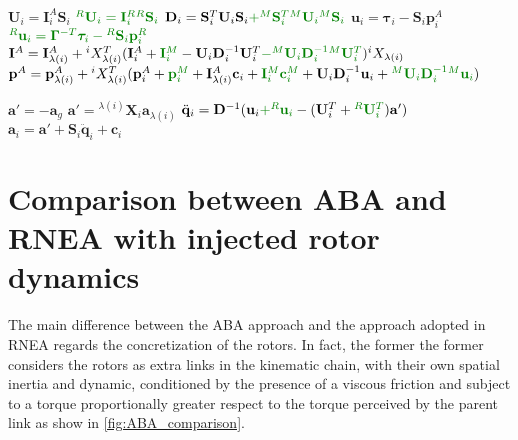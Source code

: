 \begin{algorithm}
\begin{algorithmic}[1]
        \STATE $\mathbf{U}_i = \mathbf{I}_i ^A \mathbf{S}_i$
        \STATE $\color{webgreen}{{}^R\mathbf{U}_i = \mathbf{I}_i ^R {}^R\mathbf{S}_i}$
        \STATE $\mathbf{D} _i = \mathbf{S} ^T _i  {} \mathbf{U} _i \mathbf{S} _i \textcolor{webgreen}{+ {} ^M\mathbf{S} ^T _i  {} ^M\mathbf{U} _i {} ^M\mathbf{S} _i}$
        \STATE $\mathbf{u}_i = \boldsymbol{\tau}_i - \mathbf{S}_i\mathbf{p}_i^A$
        \STATE $\color{webgreen}{{}^R\mathbf{u}_i = \boldsymbol{\Gamma}^{-T}\boldsymbol{\tau}_i - {}^R\mathbf{S}_i\mathbf{p}_i^R}$
        \STATE $\mathbf{I} ^A = \mathbf{I} ^A _{\lambda (i)} + {} ^i X _{\lambda (i)} ^T (\mathbf{I} _i ^A + \textcolor{webgreen}{\mathbf{I} _i ^M } - {}  \mathbf{U} _i  \mathbf{D} ^{-1} _i  {}  \mathbf{U} ^T _i \textcolor{webgreen}{- {} ^M \mathbf{U} _i  \mathbf{D} ^{-1} _i {} ^M \mathbf{U} ^T _i}) {} ^i X _{\lambda (i)} $
        \STATE $\mathbf{p} ^A = \mathbf{p} ^A _{\lambda (i)} + {} ^i X _{\lambda (i)} ^T (\mathbf{p} ^A_i + \textcolor{webgreen}{\mathbf{p} ^M_i } + \mathbf{I} ^A _{\lambda (i)}  \mathbf{c}_i + \textcolor{webgreen}{\mathbf{I} {} ^M _i \mathbf{c} ^M _i }+ {}  \mathbf{U} _i \mathbf{D} ^{-1} _i {} \mathbf{u} _i + \textcolor{webgreen}{{} ^M \mathbf{U} _i \mathbf{D} ^{-1} _i {} ^M\mathbf{u} _i}) $
        \ENDIF
        \ENDFOR

        \STATE $\mathbf{a}' = -\mathbf{a}_g$
        \ELSE
        \STATE $\mathbf{a}' = {}^{\lambda(i)}\mathbf{X}_i \mathbf{a}_{\lambda(i)}$
        \STATE $\ddot{\mathbf{q}}_i = \mathbf{D}^{-1} (\mathbf{u}_i \textcolor{webgreen}{+ {}^R\mathbf{u}_i }- (\mathbf{U}_i^T + \textcolor{webgreen}{{}^R\mathbf{U}_i^T})\mathbf{a}')$
        \STATE $\mathbf{a}_i = \mathbf{a}' + \mathbf{S}_i\mathbf{\ddot{q}}_i + \mathbf{c} _i$
        \ENDIF
        \ENDFOR
    \end{algorithmic}
\end{algorithm}



\section{Comparison between ABA and RNEA with injected rotor dynamics}

The main difference between the \ac{ABA} approach and the approach adopted in \ac{RNEA} regards the concretization of the rotors. In fact, the former the former considers the rotors as extra links in the kinematic chain, with their own spatial inertia and dynamic, conditioned by the presence of a viscous friction and subject to a torque proportionally greater respect to the torque perceived by the parent link as show in \cref{fig:ABA_comparison}.

